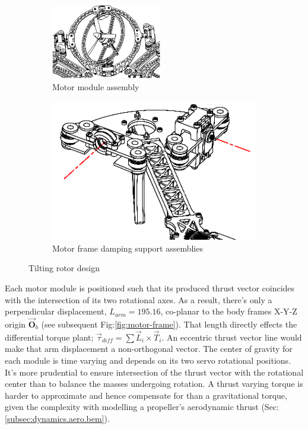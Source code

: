 \begin{figure}[hbtp]
\begin{subfigure}{.49\textwidth}
\centering
\includegraphics[width=\textwidth]{figs/motor-assembly}
\caption{Motor module assembly}
\label{fig:motor-assembly}
\end{subfigure}
\begin{subfigure}{.49\textwidth}
\centering
\includegraphics[width=\textwidth]{figs/motor-support}
\caption{Motor frame damping support assemblies}
\label{fig:motor_support}
\end{subfigure}
\caption{Tilting rotor design}
\end{figure}
Each motor module is positioned such that its produced thrust vector coincides with the intersection of its two rotational axes. As a result, there's only a perpendicular displacement, $L_{arm}=195.16$, co-planar to the body frames X-Y-Z origin $\vec{\mathbf{O}}_b$ (see subsequent Fig:\ref{fig:motor-frame}). That length directly effects the differential torque plant; $\vec{\tau}_{diff}=\sum\vec{L}_i\times\vec{T}_i$. An eccentric thrust vector line would make that arm displacement a non-orthogonal vector. The center of gravity for each module is time varying and depends on its two servo rotational positions. It's more prudential to ensure intersection of the thrust vector with the rotational center than to balance the masses undergoing rotation. A thrust varying torque is harder to approximate and hence compensate for than a gravitational torque, given the complexity with modelling a propeller's aerodynamic thrust (Sec:\ref{subsec:dynamics.aero.bem}).
